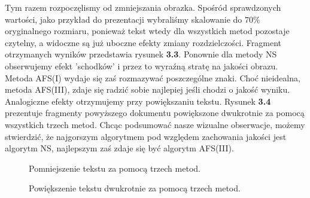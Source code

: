 Tym razem rozpoczęlismy od zmniejszania obrazka. Spośród sprawdzonych wartości,
jako przykład do prezentacji wybraliśmy skalowanie do $70\%$ oryginalnego
rozmiaru, ponieważ tekst wtedy dla wszystkich metod pozostaje czytelny, a
widoczne są już uboczne efekty zmiany rozdzielczości. Fragment otrzymanych
wyników przedstawia rysunek \textbf{3.3}. Ponownie dla metody NS obserwujemy
efekt 'schodków' i przez to wyraźną stratę na jakości obrazu. Metoda AFS(I)
wydaje się zaś rozmazywać poszczególne znaki. Choć nieidealna, metoda AFS(III),
zdaje się radzić sobie najlepiej jeśli chodzi o jakość wyniku. Analogiczne efekty
otrzymujemy przy powiększaniu tekstu. Rysunek \textbf{3.4} prezentuje
fragmenty powyższego dokumentu powiększone dwukrotnie za pomocą wszystkich trzech metod. Chcąc
podsumować nasze wizualne obserwacje, możemy stwierdzić, że najgorszym algorytmem pod względem zachowania
jakości jest algorytm NS, najlepszym zaś zdaje się być algorytm AFS(III).
\begin{figure}[h!tb]
\begin{center}
\caption{Pomniejszenie tekstu za pomocą trzech metod.}
\end{center}
\end{figure}
\begin{figure}
\begin{center}
\caption{Powiększenie tekstu dwukrotnie za pomocą trzech metod.}
\end{center}
\end{figure}

